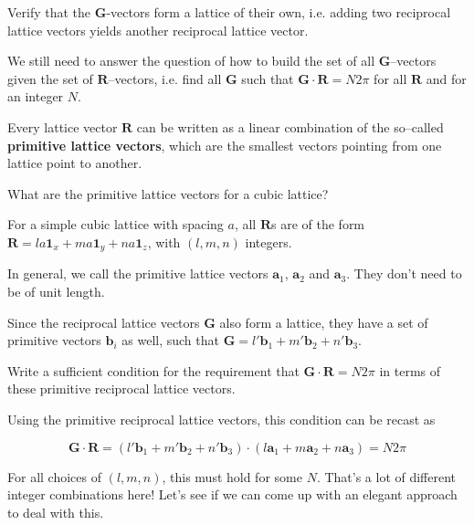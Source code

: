 \begin{exer}
Verify that the  ${\mathbf G}$-vectors form a lattice of their own, i.e. adding two reciprocal lattice vectors yields another reciprocal lattice vector.
\end{exer}

We still need to answer the question of how to build the set of all ${\mathbf G}$--vectors given the set of ${\mathbf R}$--vectors, i.e. find all ${\mathbf G}$ such that ${\mathbf G} \cdot {\mathbf R} = N 2 \pi$ for all ${\mathbf R}$ and for an integer $N$.

Every lattice vector ${\mathbf R}$ can be written as a linear combination of the so--called \textbf{primitive lattice vectors}, which are the smallest vectors pointing from one lattice point to another.

\begin{cue}
  What are the primitive lattice vectors for a cubic lattice?
\end{cue}

For a simple cubic lattice with spacing $a$, all ${\mathbf R}$s are of the form ${\mathbf R} = la {\mathbf 1}_x + ma {\mathbf 1}_y + na {\mathbf 1}_z$, with $(l,m,n)$ integers.

In general, we call the primitive lattice vectors ${\mathbf a}_1$, ${\mathbf a}_2$ and ${\mathbf a}_3$. They don't need to be of unit length.

Since the reciprocal lattice vectors ${\mathbf G}$ also form a lattice, they have a set of primitive vectors ${\mathbf b}_i$ as well, such that ${\mathbf G} = l' {\mathbf b}_1 + m' {\mathbf b}_2 + n' {\mathbf b}_3$.

\begin{cue}
Write a sufficient condition for the requirement that ${\mathbf G} \cdot {\mathbf R} = N 2 \pi$ in terms of these primitive reciprocal lattice vectors.
\end{cue}

Using the primitive reciprocal lattice vectors, this condition can be recast as

\begin{equation}
{\mathbf G} \cdot {\mathbf R} = ( l' {\mathbf b}_1 + m' {\mathbf b}_2 + n' {\mathbf b}_3) \cdot (l {\mathbf a}_1 + m {\mathbf a}_2 + n {\mathbf a}_3)  = N 2 \pi 
\end{equation} 

For all choices of $(l,m,n)$, this must hold for some $N$. That's a lot of different integer combinations here! Let's see if we can come up with an elegant approach to deal with this.


